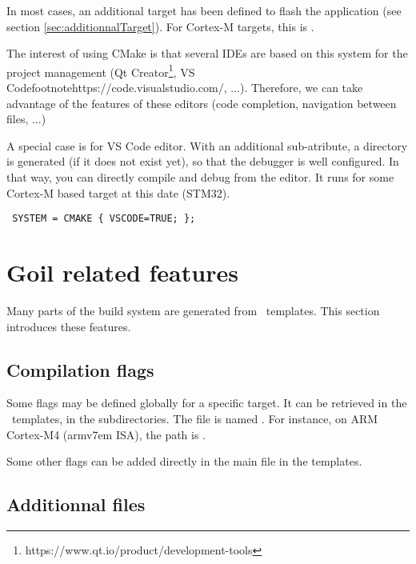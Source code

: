 In most cases, an additional target has been defined to flash the application (see section \ref{sec:additionnalTarget}). For Cortex-M targets, this is .


The interest of using CMake is that several IDEs are based on this system for the project management (Qt Creator{\footnote{https://www.qt.io/product/development-tools}}, VS Code{footnote{https://code.visualstudio.com/}}, ...). Therefore, we can take advantage of the features of these editors (code completion, navigation between files, ...)

A special case is for VS Code editor. With an additional sub-atribute, a  directory is generated (if it does not exist yet), so that the debugger is well configured. In that way, you can directly compile and debug from the editor.
It runs for some Cortex-M based target at this date (STM32).
\lstset{language=OIL}
\begin{lstlisting}
 SYSTEM = CMAKE { VSCODE=TRUE; };
\end{lstlisting}

\section{Goil related features}

Many parts of the build system are generated from \goil\ templates. This section introduces these features.

\subsection{Compilation flags}

Some flags may be defined globally for a specific target. It can be retrieved in the \goil\ templates, in the  subdirectories. The file is named . For instance, on ARM Cortex-M4 (armv7em ISA), the path is .

Some other flags can be added directly in the main  file in the templates.

\subsection{Additionnal files}

